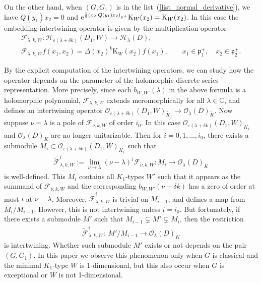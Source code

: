 \documentclass[pdftex]{sigma}
\numberwithin{equation}{section}
\newcommand{\BC}{\mathbb{C}}
\newcommand{\fp}{\mathfrak{p}}
\newcommand{\cF}{\mathcal{F}}
\newcommand{\cH}{\mathcal{H}}
\newcommand{\cO}{\mathcal{O}}
\newcommand{\rK}{\mathrm{K}}
\begin{document}
On the other hand, when $(G,G_1)$ is in the list~(\ref{list_normal_derivative}), we have $Q(y_1)x_2=0$ and
${\rm e}^{\frac{1}{2}(x_2|Q(y_1)x_2)_{\fp^+}}\rK_{W}(x_2)=\rK_W(x_2)$.
In this case the embedding intertwining operator is given by the multiplication operator
\begin{gather*}
\cF_{\lambda,k,W}\colon \cH_{\varepsilon(\lambda+\delta k)}(D_1,W)\to\cH_\lambda(D), \\
\cF_{\lambda,k,W}f(x_1,x_2)=\Delta(x_2)^k\rK_{W}(x_2)f(x_1), \qquad x_1\in\fp^+_1,\quad x_2\in\fp^+_2.
\end{gather*}

By the explicit computation of the intertwining operators, we can study how the operator depends on the parameter of the holomorphic discrete series representation. More precisely, since each $b_{W,W'}(\lambda)$ in the above formula is a holomorphic polynomial, $\cF_{\lambda,k,W}$ extends meromorphically for all $\lambda\in\BC$, and defines an intertwining operator $\cO_{\varepsilon(\lambda+\delta k)}(D_1,W)_{\tilde{K}_1}\to\cO_\lambda(D)_{\tilde{K}}$. Now suppose $\nu=\lambda$ is a pole of $\cF_{\nu,k,W}$ of order $i_0$. In this case $\cO_{\varepsilon(\lambda+\delta k)}(D_1,W)_{\tilde{K}_1}$ and $\cO_\lambda(D)_{\tilde{K}}$ are no longer unitarizable. Then for $i=0,1,\ldots,i_0$, there exists a submodule $M_i\subset \cO_{\varepsilon(\lambda+\delta k)}(D_1,W)_{\tilde{K}_1}$ such that
\begin{gather*} \tilde{\cF}_{\lambda,k,W}^i:=\lim_{\nu\to\lambda}(\nu-\lambda)^i\cF_{\nu,k,W}\colon M_i\to\cO_\lambda(D)_{\tilde{K}} \end{gather*}
is well-defined. This $M_i$ contains all $K_1$-types $W'$ such that it appears as the summand of $\cF_{\nu,k,W}$ and the corresponding $b_{W,W'}(\nu+\delta k)$ has a zero of order at most $i$ at $\nu=\lambda$. Moreover, $\tilde{\cF}_{\lambda,k,W}^i$ is trivial on $M_{i-1}$, and defines a map from $M_i/M_{i-1}$. However, this is not intertwining unless $i=i_0$. But fortunately, if there exists a submodule $M'$ such that $M_{i-1}\subsetneq M'\subsetneq M_i$, then the restriction
\begin{gather*} \tilde{\cF}_{\lambda,k,W}^i\colon \ M'/M_{i-1}\to\cO_\lambda(D)_{\tilde{K}} \end{gather*}
is intertwining. Whether such submodule $M'$ exists or not depends on the pair $(G,G_1)$. In this paper we observe this phenomenon only when $G$ is classical and the minimal $K_1$-type $W$ is 1-dimensional, but this also occur when $G$ is exceptional or $W$ is not 1-dimensional.
\end{document}
